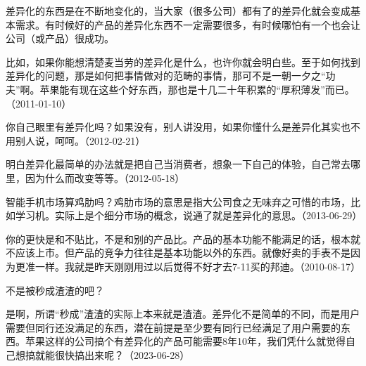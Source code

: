差异化的东西是在不断地变化的，当大家（很多公司）都有了的差异化就会变成基本需求。有时候好的产品的差异化东西不一定需要很多，有时候哪怕有一个也会让公司（或产品）很成功。

比如，如果你能想清楚麦当劳的差异化是什么，也许你就会明白些。至于如何找到差异化的问题，那是如何把事情做对的范畴的事情，那可不是一朝一夕之“功夫”啊。苹果能有现在这些个好东西，那也是十几二十年积累的“厚积薄发”而已。（2011-01-10）


你自己眼里有差异化吗？如果没有，别人讲没用，如果你懂什么是差异化其实也不用别人说，呵呵。（2012-02-21）

明白差异化最简单的办法就是把自己当消费者，想象一下自己的体验，自己常去哪里，因为什么而改变等等。（2012-05-18）


智能手机市场算鸡肋吗？鸡肋市场的意思是指大公司食之无味弃之可惜的市场，比如学习机。实际上是个细分市场的概念，说通了就是差异化的意思。（2013-06-29）


你的更快是和不贴比，不是和别的产品比。产品的基本功能不能满足的话，根本就不应该上市。但产品的竞争力往往是基本功能以外的东西。就像好卖的手表不是因为更准一样。我就是昨天刚刚用过以后觉得不好才去7-11买的邦迪。（2010-08-17）


不是被秒成渣渣的吧？


是啊，所谓“秒成”渣渣的实际上本来就是渣渣。差异化不是简单的不同，而是用户需要但同行还没满足的东西，潜在前提是至少要有同行已经满足了用户需要的东西。苹果这样的公司搞个有差异化的产品可能需要8年10年，我们凭什么就觉得自己想搞就能很快搞出来呢？（2023-06-28）

